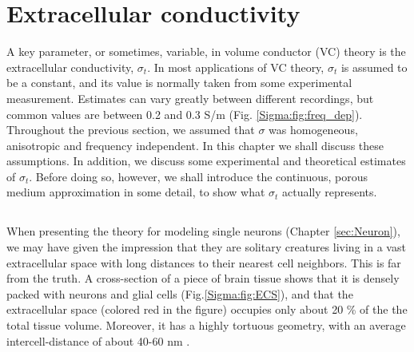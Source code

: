 \section{Extracellular conductivity}
\label{sec:Sigma}

A key parameter, or sometimes, variable, in volume conductor (VC) theory is the extracellular conductivity, $\sigma_t$. In most applications of VC theory, $\sigma_t$ is assumed to be a constant, and its value is normally taken from some experimental measurement. Estimates can vary greatly between different recordings, but common values are between 0.2 and 0.3 S/m (Fig. \ref{Sigma:fig:freq_dep}). Throughout the previous section, we assumed that  $\sigma$  was homogeneous, anisotropic and frequency independent. In this chapter we shall discuss these assumptions. In addition, we discuss some experimental and theoretical estimates of  $\sigma_t$. Before doing so, however, we shall introduce the continuous, porous medium approximation in some detail, to show what $\sigma_t$ actually represents.


\subsection{}
\label{sec:VC:continuous}

When presenting the theory for modeling single neurons (Chapter \ref{sec:Neuron}), we may have given the impression that they are solitary creatures living in a vast extracellular space with long distances to their nearest cell neighbors. This is far from the truth. A cross-section of a piece of brain tissue shows that it is densely packed with neurons and glial cells (Fig.\ref{Sigma:fig:ECS}), and that the extracellular space (colored red in the figure) occupies only about 20 \% of the the total tissue volume. Moreover, it has a highly tortuous  geometry, with an average intercell-distance of about 40-60 nm \citep{Sykova2008}. 

